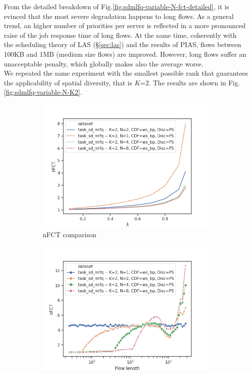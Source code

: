 From the detailed breakdown of Fig.\ref{fig:sdmlfq-variable-N-fct-detailed}, it is evinced that the most severe degradation happens to long flows. As a general trend, an higher number of priorities per server is reflected in a more pronounced raise of the job response time of long flows. At the same time, coherently with the scheduling theory of LAS (\S \ref{sec:las}) and the results of PIAS, flows between 100KB and 1MB (medium size flows) are improved. However, long flows suffer an unacceptable penalty, which globally makes also the average worse.  \\
We repeated the same experiment with the smallest possible rank that guarantees the applicability of spatial diversity, that is $K$=2. The results are shown in Fig. \ref{fig:sdmlfq-variable-N-K2}. 
\begin{figure}
	\centering
	\begin{subfigure}{.5\textwidth}
		\centering
		\includegraphics[width=0.99\textwidth]{Chapter3/Figures/sd_mlfq_k2_comparison.png}
		\caption{nFCT comparison}
		\label{fig:sdmlfq-variable-N-fct-K2}
	\end{subfigure}%
	\hfill
	\begin{subfigure}{.5\textwidth}
		\centering
		\includegraphics[width=0.99\textwidth]{Chapter3/Figures/sd_mlfq_k2_detailed.png}

\end{subfigure}
\end{figure}
